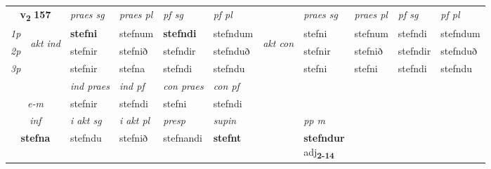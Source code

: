 \noindent
\begin{tabular}{lllllllllll} \toprule
\multicolumn{2}{c}{\textbf{v{\textsubscript{2}}} \Large{\textbf{157}}}  &  \textit{praes sg}  & \textit{praes pl}  &\textit{ pf sg} & \textit{pf pl} &  &  \textit{praes sg}  & \textit{praes pl}  & \textit{pf sg} & \textit{pf pl } \\*
	\cmidrule{3-6} \cmidrule{8-11}
 {\textit{1p}} & \multirow{3}{*}{\begin{turn}{90}\textit{akt ind}\end{turn}} & \textbf{stefni} & stefnum & \textbf{stefndi} & stefndum & \multirow{3}{*}{\begin{turn}{90}\textit{akt con}\end{turn}} &stefni & stefnum & stefndi & stefndum\\*
 {\textit{2p}} &  &  stefnir  & stefnið & stefndir & stefnduð & & stefnir & stefnið & stefndir & stefnduð \\*
{\textit{3p}} &  & stefnir & stefna & stefndi & stefndu & & stefni & stefni& stefndi & stefndu \\*
\cmidrule{3-6} \cmidrule{8-11}

   & &  \textit{ind praes} & \textit{ind pf} & \textit{con praes} & \textit{con pf} \\*
\multicolumn{2}{c}{ \textit{e-m} } & stefnir & stefndi & stefni & stefndi \\*

\cmidrule{3-8}
   \multicolumn{2}{c}{\textit{inf}}  & \textit{i akt sg} & \textit{i akt pl}   & \textit{presp} & \textit{supin}  && \textit{pp m} \\*
  \multicolumn{2}{c}{\textbf{stefna}} & stefndu  & stefnið   & stefnandi &  \textbf{stefnt}  && \specialcell{\textbf{stefndur} \\ adj\textbf{\textsubscript{2-14}}} \\*
\end{tabular}

